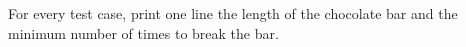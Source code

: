 For every test case, print one line the length of the chocolate bar and the minimum number of times to break the bar.
